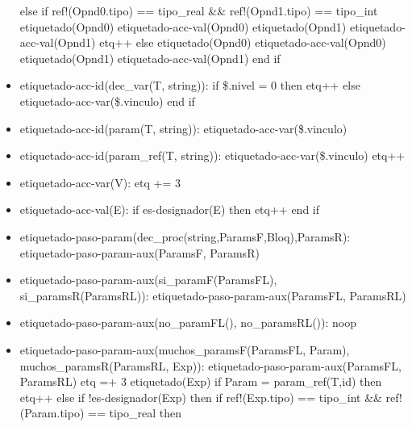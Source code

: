 \documentclass[11pt]{article}
\begin{document}
\begin{itemize}
            \subitem else if ref!(Opnd0.tipo) == tipo\_real \&\& ref!(Opnd1.tipo) == tipo\_int
                \subsubitem etiquetado(Opnd0)
                \subsubitem etiquetado-acc-val(Opnd0)
                \subsubitem etiquetado(Opnd1)
                \subsubitem etiquetado-acc-val(Opnd1)
                \subsubitem etq++
            \subitem else
                \subsubitem etiquetado(Opnd0)
                \subsubitem etiquetado-acc-val(Opnd0)
                \subsubitem etiquetado(Opnd1)
                \subsubitem etiquetado-acc-val(Opnd1)
            \subitem end if
        \item etiquetado-acc-id(dec\_var(T, string)): 
            \subitem if \$.nivel = 0 then
                \subsubitem etq++
            \subitem else
                \subsubitem etiquetado-acc-var(\$.vinculo)
            \subitem end if
        \item etiquetado-acc-id(param(T, string)): 
            \subitem etiquetado-acc-var(\$.vinculo)
        \item etiquetado-acc-id(param\_ref(T, string)): 
            \subitem etiquetado-acc-var(\$.vinculo)
            \subitem etq++
        \item etiquetado-acc-var(V): 
            \subitem etq += 3
        \item etiquetado-acc-val(E): 
            \subitem if es-designador(E) then
                \subsubitem etq++
            \subitem end if
        \item etiquetado-paso-param(dec\_proc(string,ParamsF,Bloq),ParamsR): 
            \subitem etiquetado-paso-param-aux(ParamsF, ParamsR)
        \item etiquetado-paso-param-aux(si\_paramF(ParamsFL), si\_paramsR(ParamsRL)): 
            \subitem etiquetado-paso-param-aux(ParamsFL, ParamsRL)
        \item etiquetado-paso-param-aux(no\_paramFL(), no\_paramsRL()): 
            \subitem noop
        \item etiquetado-paso-param-aux(muchos\_paramsF(ParamsFL, Param), muchos\_paramsR(ParamsRL, Exp)): 
            \subitem etiquetado-paso-param-aux(ParamsFL, ParamsRL)
            \subitem etq =+ 3
            \subitem etiquetado(Exp)
            \subitem if Param = param\_ref(T,id) then
                \subsubitem etq++
            \subitem else
                \subsubitem if !es-designador(Exp) then
                    \subsubitem \hspace{2em} if ref!(Exp.tipo) == tipo\_int \&\& ref!(Param.tipo) == tipo\_real then

\end{itemize}
\end{document}
